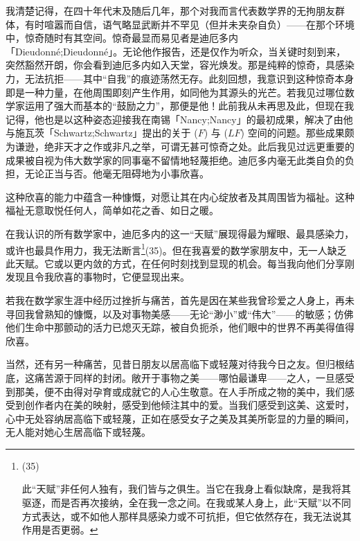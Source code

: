 我清楚记得，在四十年代末及随后几年，那个对我而言代表数学界的无拘朋友群体，有时喧嚣而自信，语气略显武断并不罕见（但并未夹杂自负）——在那个环境中，惊奇随时有其空间。惊奇最显而易见者是迪厄多内「Dieudonné;Dieudonné」。无论他作报告，还是仅作为听众，当关键时刻到来，突然豁然开朗，你会看到迪厄多内如入天堂，容光焕发。那是纯粹的惊奇，具感染力，无法抗拒——其中“自我”的痕迹荡然无存。此刻回想，我意识到这种惊奇本身即是一种力量，在他周围即刻产生作用，如同他为其源头的光芒。若我见过哪位数学家运用了强大而基本的“鼓励之力”，那便是他！此前我从未再思及此，但现在我记得，他也是以这种姿态迎接我在南锡「Nancy;Nancy」的最初成果，解决了由他与施瓦茨「Schwartz;Schwartz」提出的关于 (\(F\)) 与 (\(LF\)) 空间的问题。那些成果颇为谦逊，绝非天才之作或非凡之举，可谓无甚可惊奇之处。此后我见过远更重要的成果被自视为伟大数学家的同事毫不留情地轻蔑拒绝。迪厄多内毫无此类自负的负担，无论正当与否。他毫无阻碍地为小事欣喜。

这种欣喜的能力中蕴含一种慷慨，对愿让其在内心绽放者及其周围皆为福祉。这种福祉无意取悦任何人，简单如花之香、如日之暖。

在我认识的所有数学家中，迪厄多内的这一“天赋”展现得最为耀眼、最具感染力，或许也最具作用力，我无法断言\footnote{(35) \par 此“天赋”非任何人独有，我们皆与之俱生。当它在我身上看似缺席，是我将其驱逐，而是否再次接纳，全在我一念之间。在我或某人身上，此“天赋”以不同方式表达，或不如他人那样具感染力或不可抗拒，但它依然存在，我无法说其作用是否更弱。}(35)。但在我喜爱的数学家朋友中，无一人缺乏此天赋。它或以更内敛的方式，在任何时刻找到显现的机会。每当我向他们分享刚发现且令我欣喜的事物时，它便显现出来。

若我在数学家生涯中经历过挫折与痛苦，首先是因在某些我曾珍爱之人身上，再未寻回我曾熟知的慷慨，以及对事物美感——无论“渺小”或“伟大”——的敏感；仿佛他们生命中那颤动的活力已熄灭无踪，被自负扼杀，他们眼中的世界不再美得值得欣喜。

当然，还有另一种痛苦，见昔日朋友以居高临下或轻蔑对待我今日之友。但归根结底，这痛苦源于同样的封闭。敞开于事物之美——哪怕最谦卑——之人，一旦感受到那美，便不由得对孕育或成就它的人心生敬意。在人手所成之物的美中，我们感受到创作者内在美的映射，感受到他倾注其中的爱。当我们感受到这美、这爱时，心中无处容纳居高临下或轻蔑，正如在感受女子之美及其美所彰显的力量的瞬间，无人能对她心生居高临下或轻蔑。